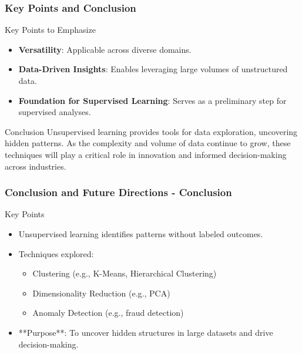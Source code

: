 \documentclass[aspectratio=169]{beamer}
\begin{document}
\begin{frame}[fragile]
  \frametitle{Key Points and Conclusion}
  \begin{block}{Key Points to Emphasize}
    \begin{itemize}
        \item \textbf{Versatility}: Applicable across diverse domains.
        \item \textbf{Data-Driven Insights}: Enables leveraging large volumes of unstructured data.
        \item \textbf{Foundation for Supervised Learning}: Serves as a preliminary step for supervised analyses.
    \end{itemize}
  \end{block}
  
  \begin{block}{Conclusion}
    Unsupervised learning provides tools for data exploration, uncovering hidden patterns. As the complexity and volume of data continue to grow, these techniques will play a critical role in innovation and informed decision-making across industries.
  \end{block}
\end{frame}

\begin{frame}[fragile]
    \frametitle{Conclusion and Future Directions - Conclusion}
    \begin{block}{Key Points}
        \begin{itemize}
            \item Unsupervised learning identifies patterns without labeled outcomes.
            \item Techniques explored:
                \begin{itemize}
                    \item Clustering (e.g., K-Means, Hierarchical Clustering)
                    \item Dimensionality Reduction (e.g., PCA)
                    \item Anomaly Detection (e.g., fraud detection)
                \end{itemize}
            \item **Purpose**: To uncover hidden structures in large datasets and drive decision-making.
        \end{itemize}
    \end{block}
\end{frame}
\end{document}
